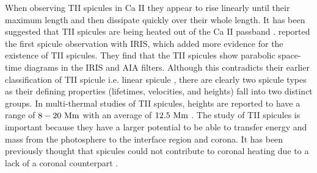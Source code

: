 %
When observing TII spicules in Ca II they appear to rise linearly until their maximum length and then dissipate quickly over their whole length. It has been suggested that TII spicules are being heated out of the Ca II passband \citep{Pontieu2007PASJ, Pereira2012, Skogsrud2015ApJ806170S, Chintzoglou2018ApJ85773C, Chintzoglou2021ApJ90682C}. \cite{Pereira2014ApJ} reported the first spicule observation with IRIS, which added more evidence for the existence of TII spicules. They find that the TII spicules show parabolic space-time diagrams in the IRIS and AIA filters. Although this contradicts their earlier classification of TII spicule i.e. linear spicule \citep{Pereira2012}, there are clearly two spicule types as their defining properties (lifetimes, velocities, and heights) fall into two distinct groups. In multi-thermal studies of TII spicules, heights are reported to have a range of $8-20~\rm{Mm}$ with an average of $12.5~\rm{Mm}$ \citep{Pereira2014ApJ, Skogsrud2015ApJ806170S}. The study of TII spicules is important because they have a larger potential to be able to transfer energy and mass from the photosphere to the interface region and corona. It has been previously thought that spicules could not contribute to coronal heating due to a lack of a  coronal counterpart \citep{Withbroe1983ApJ}.

